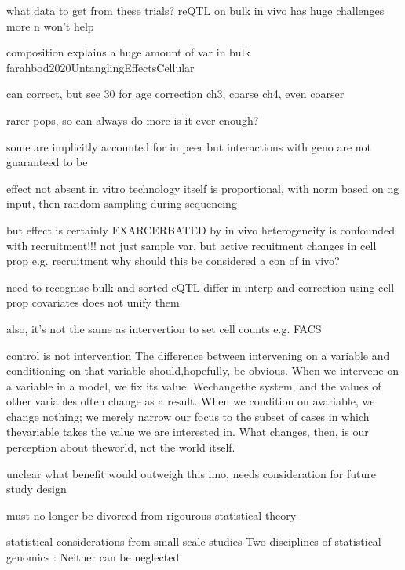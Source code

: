 \begin{outline}
what data to get from these trials?
reQTL on bulk in vivo has huge challenges
more n won't help

    composition explains a huge amount of var in bulk farahbod2020UntanglingEffectsCellular

    can correct, but see 30 for age correction
        ch3, coarse
        ch4, even coarser

        rarer pops, so can always do more
        is it ever enough?

    some are implicitly accounted for in peer
        but interactions with geno are not guaranteed to be

    effect not absent in vitro
        technology itself is proportional, with norm based on ng input, then random sampling during sequencing

    but effect is certainly EXARCERBATED by in vivo
        heterogeneity is confounded with recruitment!!!
        not just sample var, but active recuitment changes in cell prop e.g. recruitment
            why should this be considered a con of in vivo?

    need to recognise 
        bulk and sorted eQTL differ in interp
            and correction using cell prop covariates does not unify them

        also, it's not the same as intervertion to set cell counts e.g. FACS

            control is not intervention
                The difference between intervening on a variable and conditioning on that
                variable should,hopefully, be obvious. When we intervene on a variable in a
                model, we fix its value. Wechangethe system, and the values of other variables
                often change as a result. When we condition on avariable, we change nothing; we
                merely narrow our focus to the subset of cases in which thevariable takes the
                value we are interested in. What changes, then, is our perception about
                theworld, not the world itself.

    unclear what benefit would outweigh this
        imo, needs consideration for future study design

    must no longer be divorced from rigourous statistical theory

        statistical considerations from small scale studies
            Two disciplines of statistical genomics : Neither can be neglected


\end{outline}
